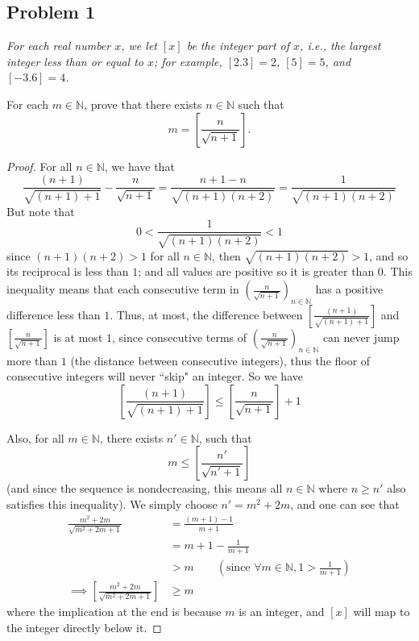 \documentclass{article}
\newcommand{\N}{{\mathbb N}}
\begin{document}
\subsection*{Problem 1}
{\it For each real number $x$, we let $[x]$ be the integer part of $x$,
i.e., the largest integer less than or equal to $x$;
for example, $[2.3] = 2$, $[5] = 5$, and $[-3.6] = 4$.

For each $m \in \N$, prove that there exists $n \in \N$ such that
\[m = \left[\frac{n}{\sqrt{n+1}}\right].\]}

\begin{proof}
	For all $n \in \N$, we have that
	\[
		\frac{(n+1)}{\sqrt{(n+1)+1}} - \frac{n}{\sqrt{n+1}}
		= \frac{n+1-n}{\sqrt{(n+1)(n+2)}}
		= \frac{1}{\sqrt{(n+1)(n+2)}}
	\]
	But note that
	\begin{equation}
		0 < \frac{1}{\sqrt{(n+1)(n+2)}} < 1
	\end{equation}
	since $(n+1)(n+2) > 1$ for all $n \in \N$, then $\sqrt{(n+1)(n+2)} > 1$,
	and so its reciprocal is less than $1$;
	and all values are positive so it is greater than $0$.
	This inequality means that each consecutive term in $\left(\frac{n}{\sqrt{n+1}}\right)_{n\in\N}$
	has a positive difference less than $1$.
	Thus, at most, the difference between $\left[\frac{(n+1)}{\sqrt{(n+1)+1}}\right]$
	and $\left[\frac{n}{\sqrt{n+1}}\right]$ is at most $1$,
	since consecutive terms of $\left(\frac{n}{\sqrt{n+1}}\right)_{n\in\N}$
	can never jump more than $1$ (the distance between consecutive integers),
	thus the floor of consecutive integers will never ``skip" an integer.
	So we have
	\begin{equation}
		 \left[\frac{(n+1)}{\sqrt{(n+1)+1}}\right] \leq \left[\frac{n}{\sqrt{n+1}}\right] + 1
	\end{equation}

	Also, for all $m \in \N$, there exists $n' \in \N$, such that
	\[
		m \leq \left[ \frac{n'}{\sqrt{n'+1}} \right]
	\]
	(and since the sequence is nondecreasing,
	this means all $n\in \N$ where $n\geq n'$ also satisfies this inequality).
	We simply choose $n' = m^2 + 2m$, and one can see that
	\begin{align*}
		\frac{m^2 + 2m}{\sqrt{m^2+2m+1}}
		&= \frac{(m+1) - 1}{m+1}\\
		&= m + 1 - \frac{1}{m+1}\\
		&> m \qquad(\text{since } \forall m\in\N, 1 > \frac{1}{m+1})\\
		\implies \left[\frac{m^2 + 2m}{\sqrt{m^2+2m+1}}\right] &\geq m
	\end{align*}
	where the implication at the end is because $m$ is an integer,
	and $[x]$ will map to the integer directly below it.


\end{proof}
\end{document}
